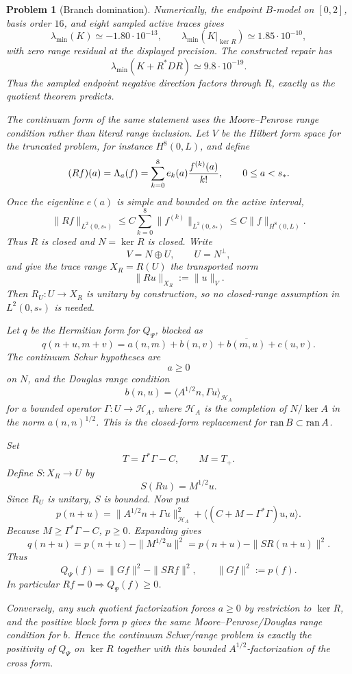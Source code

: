 \documentclass[11pt]{article}
\newtheorem{problem}[theorem]{Problem}
\begin{document}
\begin{problem}[Branch domination]
Numerically, the endpoint \(B\)-model on \([0,2]\), basis order \(16\), and
eight sampled active traces gives
\[
  \lambda_{\min}(K)\simeq -1.80\cdot10^{-13},\qquad
  \lambda_{\min}(K|_{\ker R})\simeq 1.85\cdot10^{-10},
\]
with zero range residual at the displayed precision.  The constructed repair
has
\[
  \lambda_{\min}(K+R^*DR)\simeq 9.8\cdot10^{-19}.
\]
Thus the sampled endpoint negative direction factors through \(R\), exactly as
the quotient theorem predicts.

The continuum form of the same statement uses the Moore--Penrose range
condition rather than literal range inclusion.  Let \(V\) be the Hilbert form
space for the truncated problem, for instance \(H^8(0,L)\), and define
\[
  (Rf)(a)=\Lambda_a(f)=
  \sum_{k=0}^8 e_k(a){f^{(k)}(a)\over k!},\qquad 0\le a<s_*.
\]
Once the eigenline \(e(a)\) is simple and bounded on the active interval,
\[
  \|Rf\|_{L^2(0,s_*)}
  \le C\sum_{k=0}^8\|f^{(k)}\|_{L^2(0,s_*)}
  \le C\|f\|_{H^8(0,L)}.
\]
Thus \(R\) is closed and \(N=\ker R\) is closed.  Write
\[
  V=N\oplus U,\qquad U=N^\perp,
\]
and give the trace range \(X_R=R(U)\) the transported norm
\[
  \|Ru\|_{X_R}:=\|u\|_V.
\]
Then \(R_U:U\to X_R\) is unitary by construction, so no closed-range
assumption in \(L^2(0,s_*)\) is needed.

Let \(q\) be the Hermitian form for \(Q_\Psi\), blocked as
\[
  q(n+u,m+v)
  =a(n,m)+b(n,v)+\overline{b(m,u)}+c(u,v).
\]
The continuum Schur hypotheses are
\[
  a\ge0
\]
on \(N\), and the Douglas range condition
\[
  b(n,u)=\langle A^{1/2}n,\Gamma u\rangle_{\mathcal H_A}
\]
for a bounded operator \(\Gamma:U\to\mathcal H_A\), where \(\mathcal H_A\) is
the completion of \(N/\ker A\) in the norm \(a(n,n)^{1/2}\).  This is the
closed-form replacement for \({\rm ran}\,B\subset{\rm ran}\,A\).

Set
\[
  T=\Gamma^*\Gamma-C,\qquad M=T_+.
\]
Define \(S:X_R\to U\) by
\[
  S(Ru)=M^{1/2}u.
\]
Since \(R_U\) is unitary, \(S\) is bounded.  Now put
\[
  p(n+u)
  =
  \|A^{1/2}n+\Gamma u\|_{\mathcal H_A}^2
  +\langle (C+M-\Gamma^*\Gamma)u,u\rangle .
\]
Because \(M\ge \Gamma^*\Gamma-C\), \(p\ge0\).  Expanding gives
\[
  q(n+u)=p(n+u)-\|M^{1/2}u\|^2
        =p(n+u)-\|SR(n+u)\|^2.
\]
Thus
\[
  Q_\Psi(f)=\|Gf\|^2-\|SRf\|^2,\qquad \|Gf\|^2:=p(f).
\]
In particular \(Rf=0\Rightarrow Q_\Psi(f)\ge0\).

Conversely, any such quotient factorization forces \(a\ge0\) by restriction
to \(\ker R\), and the positive block form \(p\) gives the same
Moore--Penrose/Douglas range condition for \(b\).  Hence the continuum
Schur/range problem is exactly the positivity of \(Q_\Psi\) on \(\ker R\)
together with this bounded \(A^{1/2}\)-factorization of the cross form.


\end{problem}
\end{document}
